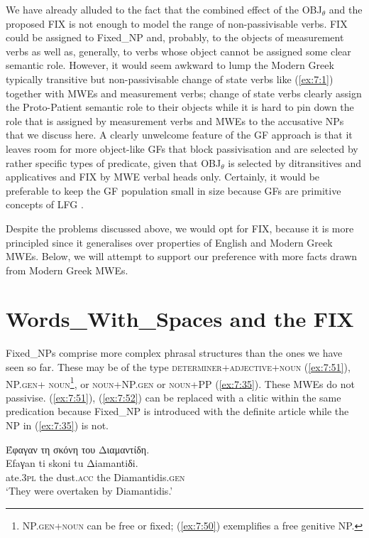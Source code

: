 \documentclass[output=paper]{langsci/langscibook}
\begin{document}
We have already alluded to the fact that the combined effect of the OBJ$_\theta$ and the proposed FIX is not enough to model the range of non-passivisable verbs. FIX could be assigned to Fixed\_NP and, probably, to the objects of measurement verbs as well as, generally, to verbs whose object cannot be assigned some clear semantic role. However, it would seem awkward to lump the Modern Greek typically transitive but non-passivisable change of state verbs like  (\ref{ex:7:1}) together with MWEs and measurement verbs; change of state verbs clearly assign the Proto-Patient semantic role to their objects while it is hard to pin down the role that is assigned by measurement verbs and MWEs to the accusative NPs that we discuss here.  A clearly unwelcome feature of the GF approach is that it leaves room for more object-like GFs that block passivisation and are selected by rather specific types of predicate, given that OBJ$_\theta$ is selected by ditransitives and applicatives and FIX by MWE verbal heads only. Certainly, it would be preferable to keep the GF population small in size because GFs are primitive concepts of LFG \citep{dalrymple2001}. 

Despite the problems discussed above, we would opt for FIX, because it is more principled since it generalises over properties of English and Modern Greek MWEs. Below, we will attempt to support our preference with more facts drawn from Modern Greek MWEs.

\section{Words\_With\_Spaces and the FIX}
\label{sec:mark:6}


Fixed\_NPs comprise more complex phrasal structures than the ones we have seen so far. These may  be of the type \textsc{determiner+adjective+noun}  (\ref{ex:7:51}), \textsc{NP.gen+} \textsc{noun}\footnote{\textsc{NP.gen+noun} can be free or fixed; (\ref{ex:7:50}) exemplifies a free genitive NP.}, or \textsc{noun+NP.gen} 
or \textsc{noun+PP} (\ref{ex:7:35}).  These MWEs do not passivise. (\ref{ex:7:51}), (\ref{ex:7:52}) can be replaced with a clitic within the same predication because \linebreak Fixed\_NP is introduced with the definite article while the NP in (\ref{ex:7:35}) is not. 

\ea
\label{ex:7:52}      
\glll Έφαγαν τη σκόνη του Διαμαντίδη.\\
Efaγan ti skoni tu Δiamantiδi.\\
             ate.\textsc{3pl} the dust.\textsc{acc} the Diamantidis.\textsc{gen}\\
\glt         `They were overtaken by Diamantidis.'
\z
\end{document}
